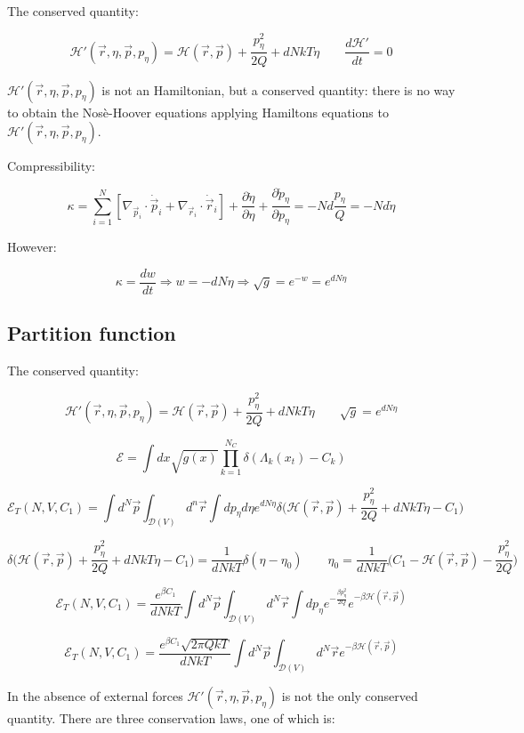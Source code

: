 	The conserved quantity:

	$$\mathcal{H}'(\vec{r}, \eta, \vec{p}, p_\eta) = \mathcal{H}(\vec{r}, \vec{p}) + \frac{p_\eta^2}{2Q} + dNkT\eta\qquad \frac{d\mathcal{H}'}{dt} = 0$$

	$\mathcal{H}'(\vec{r}, \eta, \vec{p}, p_\eta)$ is not an Hamiltonian, but a conserved quantity: there is no way to obtain the Nos\`e-Hoover equations applying Hamiltons equations to $\mathcal{H}'(\vec{r}, \eta, \vec{p}, p_\eta)$.

	Compressibility:

	$$\kappa = \sum\limits_{i=1}^N[\nabla_{\vec{p}_i}\cdot\dot{\vec{p}}_i + \nabla_{\vec{r}_i}\cdot\dot{\vec{r}}_i] + \frac{\partial\dot{\eta}}{\partial\eta} + \frac{\partial\dot{p}_\eta}{\partial p_\eta} = -Nd\frac{p_\eta}{Q} = -Nd\dot{\eta}$$

	However:

	$$\kappa = \frac{dw}{dt}\Rightarrow w = -dN\eta\Rightarrow\sqrt{g} = e^{-w} = e^{dN\eta}$$

	\subsection{Partition function}
	The conserved quantity:

	$$\mathcal{H}'(\vec{r}, \eta, \vec{p}, p_\eta) = \mathcal{H}(\vec{r}, \vec{p}) + \frac{p_\eta^2}{2Q} + dNkT\eta\qquad \sqrt{g} = e^{dN\eta}$$

	$$\mathcal{E} = \int dx\sqrt{g(x)}\prod\limits_{k=1}^{N_C}\delta(\Lambda_k(x_t) - C_k)$$

	$$\mathcal{E}_T(N, V, C_1) = \int d^N\vec{p}\int_{\mathcal{D}(V)}d^n\vec{r}\int dp_\eta d\eta e^{dN\eta}\delta\biggl(\mathcal{H}(\vec{r}, \vec{p}) + \frac{p_\eta^2}{2Q} + dNkT\eta - C_1\biggr)$$

	$$\delta\biggl(\mathcal{H}(\vec{r}, \vec{p}) + \frac{p_\eta^2}{2Q} + dNkT\eta - C_1\biggr) = \frac{1}{dNkT}\delta(\eta-\eta_0)\qquad \eta_0 = \frac{1}{dNkT}\biggl(C_1-\mathcal{H}(\vec{r}, \vec{p}) - \frac{p_\eta^2}{2Q}\biggr)$$

	$$\mathcal{E}_T(N, V, C_1) = \frac{e^{\beta C_1}}{dNkT}\int d^N\vec{p}\int_{\mathcal{D}(V)}d^N\vec{r}\int dp_\eta e^{-\frac{\beta p_\eta^2}{2Q}}e^{-\beta\mathcal{H}(\vec{r}, \vec{p})}$$

	$$\mathcal{E}_T(N, V, C_1) = \frac{e^{\beta C_1}\sqrt{2\pi Qk T}}{dNkT}\int d^N\vec{p}\int_{\mathcal{D}(V)}d^N\vec{r}e^{-\beta\mathcal{H}(\vec{r}, \vec{p})}$$

	In the absence of external forces $\mathcal{H}'(\vec{r}, \eta, \vec{p}, p_\eta)$ is not the only conserved quantity.
	There are three conservation laws, one of which is:

